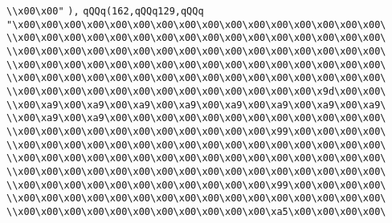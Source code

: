 \verb|\\x00\x00"|\newline
\verb|),|\newline
\verb|qQQq(162,qQQq129,qQQq|\newline
\verb|"\x00\x00\x00\x00\x00\x00\x00\x00\x00\x00\x00\x00\x00\x00\x00\x00\|\newline
\verb|\\x00\x00\x00\x00\x00\x00\x00\x00\x00\x00\x00\x00\x00\x00\x00\x00\|\newline
\verb|\\x00\x00\x00\x00\x00\x00\x00\x00\x00\x00\x00\x00\x00\x00\x00\x00\|\newline
\verb|\\x00\x00\x00\x00\x00\x00\x00\x00\x00\x00\x00\x00\x00\x00\x00\x00\|\newline
\verb|\\x00\x00\x00\x00\x00\x00\x00\x00\x00\x00\x00\x00\x00\x00\x00\x00\|\newline
\verb|\\x00\x00\x00\x00\x00\x00\x00\x00\x00\x00\x00\x00\x00\x9d\x00\x00\|\newline
\verb|\\x00\xa9\x00\xa9\x00\xa9\x00\xa9\x00\xa9\x00\xa9\x00\xa9\x00\xa9\|\newline
\verb|\\x00\xa9\x00\xa9\x00\x00\x00\x00\x00\x00\x00\x00\x00\x00\x00\x00\|\newline
\verb|\\x00\x00\x00\x00\x00\x00\x00\x00\x00\x00\x00\x99\x00\x00\x00\x00\|\newline
\verb|\\x00\x00\x00\x00\x00\x00\x00\x00\x00\x00\x00\x00\x00\x00\x00\x00\|\newline
\verb|\\x00\x00\x00\x00\x00\x00\x00\x00\x00\x00\x00\x00\x00\x00\x00\x00\|\newline
\verb|\\x00\x00\x00\x00\x00\x00\x00\x00\x00\x00\x00\x00\x00\x00\x00\x00\|\newline
\verb|\\x00\x00\x00\x00\x00\x00\x00\x00\x00\x00\x00\x99\x00\x00\x00\x00\|\newline
\verb|\\x00\x00\x00\x00\x00\x00\x00\x00\x00\x00\x00\x00\x00\x00\x00\x00\|\newline
\verb|\\x00\x00\x00\x00\x00\x00\x00\x00\x00\x00\x00\xa5\x00\x00\x00\x00\|\newline
